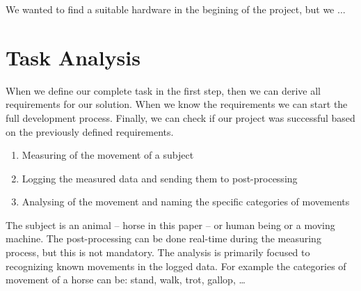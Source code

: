 \documentclass[12pt,a4paper]{article}
\begin{document}
\tableofcontents

\vspace{3cm}

We wanted to find a suitable hardware in the begining of the project, but we ...


\section{Task Analysis}
\label{HWtaskAnalysis}
When we define our complete task in the first step, then we can derive all requirements for our solution. When we know the requirements we can start the full development process. Finally, we can check if our project was successful based on the previously defined requirements.

\vspace{0.5cm}
\begin{tcolorbox}[title=Movement analysis task description]
		\begin{enumerate}
		\item Measuring of the movement of a subject
		\item Logging the measured data and sending them to post-processing
		\item Analysing of the movement and naming the specific categories of movements
	\end{enumerate}
\end{tcolorbox}
\vspace{0.5cm}

The subject is an animal -- horse in this paper -- or human being or a moving machine. The post-processing can be done real-time during the measuring process, but this is not mandatory. The analysis is primarily focused to recognizing known movements in the logged data. For example the categories of movement of a horse can be: stand, walk, trot, gallop, \dots
\end{document}
